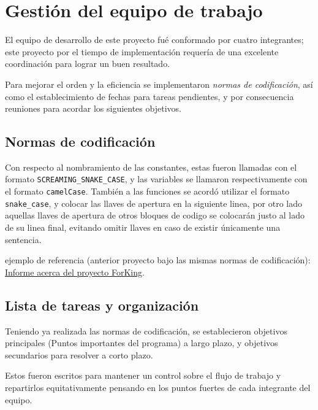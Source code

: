 \section{Gestión del equipo de trabajo}
El equipo de desarrollo de este proyecto fué conformado por cuatro integrantes; este proyecto por el tiempo de implementación requería de una excelente coordinación para lograr un buen resultado.

Para mejorar el orden y la eficiencia se implementaron \textit{normas de codificación}, así como el establecimiento de fechas para tareas pendientes, y por consecuencia reuniones para acordar los siguientes objetivos.

\subsection{Normas de codificación}
Con respecto al nombramiento de las constantes, estas fueron llamadas con el formato \texttt{SCREAMING\_SNAKE\_CASE}, y las variables se llamaron respectivamente con el formato \texttt{camelCase}. También a las funciones se acordó utilizar el formato \texttt{snake\_case}, y colocar las llaves de apertura en la siguiente linea, por otro lado aquellas llaves de apertura de otros bloques de codigo se colocarán justo al lado de su linea final, evitando omitir llaves en caso de existir únicamente una sentencia.

ejemplo de referencia (anterior proyecto bajo las mismas normas de codificación): \href{https://github.com/ayrvanmo/ForKing/blob/master/docs/forKingDoc.pdf}{Informe acerca del proyecto ForKing}.

\subsection{Lista de tareas y organización}
Teniendo ya realizada las normas de codificación, se establecieron objetivos principales (Puntos importantes del programa) a largo plazo, y objetivos secundarios para resolver a corto plazo.

Estos fueron escritos para  mantener un control sobre el flujo de trabajo y repartirlos equitativamente pensando en los puntos fuertes de cada integrante del equipo.